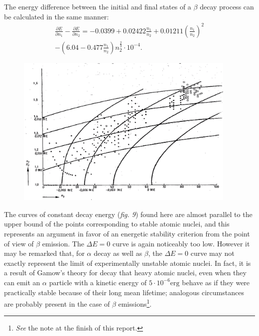 \documentclass[a4paper,11pt]{article}
\newcommand{\?}[2]{#1\footnote{\textsc{Translator note}: #2}}
\newcommand{\nequ}[2]{\begin{align*}\tag{#1}#2\end{align*}}
\newcommand{\pXpY}[2]{\frac{\partial #1}{\partial #2}}
\begin{document}
{{The energy difference between the initial and final states of a $\beta$ decay process can be calculated in the same manner:
\nequ{35}{
\pXpY{E}{n_1} - \pXpY{E}{n_2} = -0.0399 + 0.02422\frac{n_1}{n_2}
+ 0.01211\left(\frac{n_1}{n_2}\right)^2\\
- \left(6.04 - 0.477\frac{n_1}{n_2}\right)n_2^\frac{2}{3}\cdot 10^{-4}.
}
\begin{figure}[h!]
\centering
\includegraphics[width=300pt]{images/Fig9}
\end{figure}
The curves of constant decay energy (\textit{fig. 9}) found here are almost parallel to the upper bound of the points corresponding to stable atomic nuclei, and this represents an argument in favor of an energetic stability criterion from the point of view of $\beta$ emission. The $\Delta E = 0$ curve is again noticeably too low. However it may be remarked that, for $\alpha$ decay as well as $\beta$, the $\Delta E=0$ curve may not exactly represent the limit of experimentally unstable atomic nuclei. In fact, it is a result of Gamow's theory for decay that heavy atomic nuclei, even when they can emit an $\alpha$ particle with a kinetic energy of $5\cdot 10^{-6} \text{erg}$ behave as if they were practically stable because of their long mean lifetime; analogous circumstances are probably present in the case of $\beta$ emissions\footnote{\textit{See} the note at the finish of this report.}.
\begin{figure}[h!]
\centering

\end{figure}}}
\end{document}
